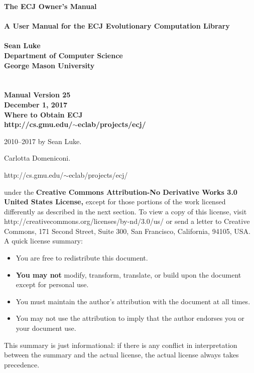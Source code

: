 \documentclass[twoside,10pt]{book}
\newcommand\booktitle{The ECJ Owner's Manual}
\newcommand\reference[1]{\vspace{0.5em}\hfill{\parbox{6in}{\raggedleft\noindent\textsf{#1}}}}
\begin{document}
\noindent\huge\bf \booktitle\\
\\
{\large\rm A User Manual for the ECJ Evolutionary Computation Library}\\
\\
\Large\bf Sean Luke\\
{\large\rm 
Department of Computer Science\\
George Mason University}
\\
\\
\\
\large\rm {\bf Manual Version 25}\\
\large\rm December 1, 2017\\

\vspace{5.6in}
\noindent\Large\bf Where to Obtain ECJ\\
\large\rm http:/\!/cs.gmu.edu/\!\(\sim\)eclab/projects/ecj/

\clearpage

\small 
{}  2010--2017 by Sean Luke.

\vspace{0.25in}
 Carlotta Domeniconi.

\vspace{0.25in}


\reference{http:/\!/cs.gmu.edu/\!\(\sim\)eclab/projects/ecj/}

\vspace{0.15in}

\vspace{0.15in}
	 under the {\bf Creative Commons Attribution-No Derivative Works 3.0 United States License,} except for those portions of the work licensed differently as described in the next section. To view a copy of this license, visit http:/\!/creativecommons.org/licenses/by-nd/3.0/us/ or send a letter to Creative Commons, 171 Second Street, Suite 300, San Francisco, California, 94105, USA.  A quick license summary:
	\begin{itemize}
	\item You are free to redistribute this document.
	\vspace{-0.5em}\item {\bf You may not} modify, transform, translate, or build upon the document except for personal use.   
	\vspace{-0.5em}\item You must maintain the author's attribution with the document at all times.
	\vspace{-0.5em}\item You may not use the attribution to imply that the author endorses you or your document use.  
	\end{itemize}
	This summary is just informational: if there is any conflict in interpretation between the summary and the actual license, the actual license always takes precedence.
\end{document}
